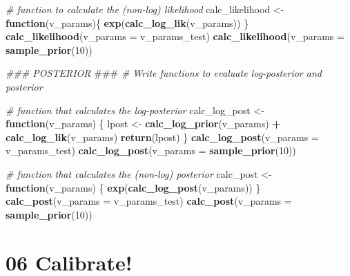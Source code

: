 \documentclass[
]{article}
\newenvironment{Shaded}{\begin{snugshade}}{\end{snugshade}}
\newcommand{\AlertTok}[1]{\textcolor[rgb]{0.94,0.16,0.16}{#1}}
\newcommand{\CommentTok}[1]{\textcolor[rgb]{0.56,0.35,0.01}{\textit{#1}}}
\newcommand{\ControlFlowTok}[1]{\textcolor[rgb]{0.13,0.29,0.53}{\textbf{#1}}}
\newcommand{\DataTypeTok}[1]{\textcolor[rgb]{0.13,0.29,0.53}{#1}}
\newcommand{\DecValTok}[1]{\textcolor[rgb]{0.00,0.00,0.81}{#1}}
\newcommand{\KeywordTok}[1]{\textcolor[rgb]{0.13,0.29,0.53}{\textbf{#1}}}
\newcommand{\NormalTok}[1]{#1}
\newcommand{\OperatorTok}[1]{\textcolor[rgb]{0.81,0.36,0.00}{\textbf{#1}}}
\newcommand{\StringTok}[1]{\textcolor[rgb]{0.31,0.60,0.02}{#1}}
\begin{document}
\begin{Shaded}
\begin{Highlighting}[]
\CommentTok{# function to calculate the (non-log) likelihood}
\NormalTok{calc_likelihood <-}\StringTok{ }\ControlFlowTok{function}\NormalTok{(v_params)\{ }
  \KeywordTok{exp}\NormalTok{(}\KeywordTok{calc_log_lik}\NormalTok{(v_params)) }
\NormalTok{\}}
\KeywordTok{calc_likelihood}\NormalTok{(}\DataTypeTok{v_params =}\NormalTok{ v_params_test)}
\KeywordTok{calc_likelihood}\NormalTok{(}\DataTypeTok{v_params =} \KeywordTok{sample_prior}\NormalTok{(}\DecValTok{10}\NormalTok{))}


\CommentTok{###  POSTERIOR  }\AlertTok{###}
\CommentTok{# Write functions to evaluate log-posterior and posterior}

\CommentTok{# function that calculates the log-posterior}
\NormalTok{calc_log_post <-}\StringTok{ }\ControlFlowTok{function}\NormalTok{(v_params) \{ }
\NormalTok{  lpost <-}\StringTok{ }\KeywordTok{calc_log_prior}\NormalTok{(v_params) }\OperatorTok{+}\StringTok{ }\KeywordTok{calc_log_lik}\NormalTok{(v_params)}
  \KeywordTok{return}\NormalTok{(lpost) }
\NormalTok{\}}
\KeywordTok{calc_log_post}\NormalTok{(}\DataTypeTok{v_params =}\NormalTok{ v_params_test)}
\KeywordTok{calc_log_post}\NormalTok{(}\DataTypeTok{v_params =} \KeywordTok{sample_prior}\NormalTok{(}\DecValTok{10}\NormalTok{))}


\CommentTok{# function that calculates the (non-log) posterior}
\NormalTok{calc_post <-}\StringTok{ }\ControlFlowTok{function}\NormalTok{(v_params) \{ }
  \KeywordTok{exp}\NormalTok{(}\KeywordTok{calc_log_post}\NormalTok{(v_params)) }
\NormalTok{\}}
\KeywordTok{calc_post}\NormalTok{(}\DataTypeTok{v_params =}\NormalTok{ v_params_test)}
\KeywordTok{calc_post}\NormalTok{(}\DataTypeTok{v_params =} \KeywordTok{sample_prior}\NormalTok{(}\DecValTok{10}\NormalTok{))}
\end{Highlighting}
\end{Shaded}

\hypertarget{calibrate}{%
\section{06 Calibrate!}\label{calibrate}}
\end{document}
